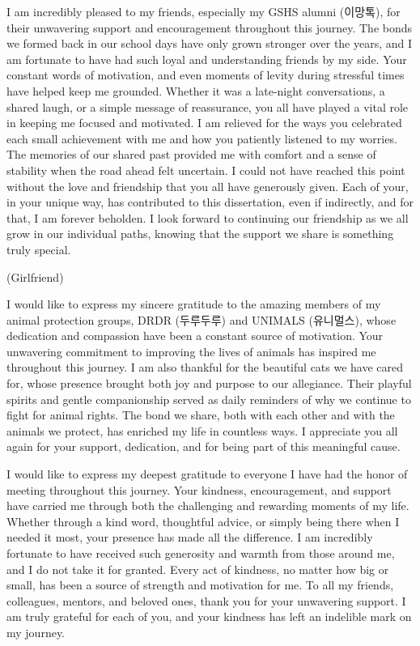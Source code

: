 \documentclass[11pt, a4paper, onecolumn, oneside]{report}
\begin{document}
        I am incredibly pleased to my friends, especially my GSHS alumni (이망톡), for their unwavering support and encouragement throughout this journey. The bonds we formed back in our school days have only grown stronger over the years, and I am fortunate to have had such loyal and understanding friends by my side. Your constant words of motivation, and even moments of levity during stressful times have helped keep me grounded. Whether it was a late-night conversations, a shared laugh, or a simple message of reassurance, you all have played a vital role in keeping me focused and motivated. I am relieved for the ways you celebrated each small achievement with me and how you patiently listened to my worries. The memories of our shared past provided me with comfort and a sense of stability when the road ahead felt uncertain. I could not have reached this point without the love and friendship that you all have generously given. Each of your, in your unique way, has contributed to this dissertation, even if indirectly, and for that, I am forever beholden. I look forward to continuing our friendship as we all grow in our individual paths, knowing that the support we share is something truly special.

        (Girlfriend)

        I would like to express my sincere gratitude to the amazing members of my animal protection groups, DRDR (두루두루) and UNIMALS (유니멀스), whose dedication and compassion have been a constant source of motivation. Your unwavering commitment to improving the lives of animals has inspired me throughout this journey. I am also thankful for the beautiful cats we have cared for, whose presence brought both joy and purpose to our allegiance. Their playful spirits and gentle companionship served as daily reminders of why we continue to fight for animal rights. The bond we share, both with each other and with the animals we protect, has enriched my life in countless ways. I appreciate you all again for your support, dedication, and for being part of this meaningful cause.

        I would like to express my deepest gratitude to everyone I have had the honor of meeting throughout this journey. Your kindness, encouragement, and support have carried me through both the challenging and rewarding moments of my life. Whether through a kind word, thoughtful advice, or simply being there when I needed it most, your presence has made all the difference. I am incredibly fortunate to have received such generosity and warmth from those around me, and I do not take it for granted. Every act of kindness, no matter how big or small, has been a source of strength and motivation for me. To all my friends, colleagues, mentors, and beloved ones, thank you for your unwavering support. I am truly grateful for each of you, and your kindness has left an indelible mark on my journey.
\end{document}
